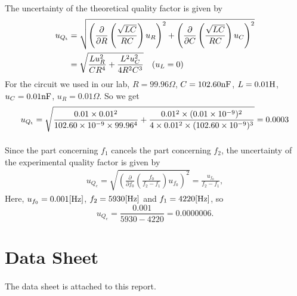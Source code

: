 \documentclass{my_template}
\renewcommand{\d}{{\rm d}}
\newcommand{\e}{\mathcal{E}}
\begin{document}
    \paragraph{} The uncertainty of the theoretical quality factor is given by 
    \begin{equation*}
        \begin{split}
            u_{Q_{\rm t}}&=\sqrt{\left(\frac{\partial}{\partial R}\left(\frac{\sqrt{LC}}{RC}\right)u_R\right)^2+\left(\frac{\partial}{\partial C}\left(\frac{\sqrt{LC}}{RC}\right)u_C\right)^2}\\
            &=\sqrt{\frac{Lu_R^2}{CR^4}+\frac{L^2u_C^2}{4R^2C^3}}\quad (u_L=0)
        \end{split}
    \end{equation*}
    For the circuit we used in our lab, $R=99.96\Omega$, $C=102.60\rm nF$, $L=0.01\rm H$, $u_C=0.01\rm nF$, $u_R=0.01\Omega$. So we get \[u_{Q_{\rm t}}=\sqrt{\frac{0.01\times 0.01^2}{102.60\times 10^{-9}\times 99.96^4}+\frac{0.01^2\times (0.01\times 10^{-9})^2}{4\times 0.01^2\times (102.60\times 10^{-9})^3}}=0.0003\]
    \vspace{-5mm}
    \paragraph{} Since the part concerning $f_1$ cancels the part concerning $f_2$, the uncertainty of the experimental quality factor is given by 
    \begin{equation*}
        \begin{split}
            u_{Q_e}=\sqrt{\left(\frac{\partial}{\partial f_0}\left(\frac{f_0}{f_2-f_1}\right)u_{f_0}\right)^2}=\frac{u_{f_0}}{f_2-f_1},
        \end{split}
    \end{equation*}
    Here, $u_{f_0}=0.001[\rm Hz]$, $f_2=5930[\rm Hz]$ and $f_1=4220[\rm Hz]$, so \[u_{Q_e}=\frac{0.001}{5930-4220}=0.0000006.\]
    \section{Data Sheet} 
    \paragraph{} The data sheet is attached to this report.
\end{document}
